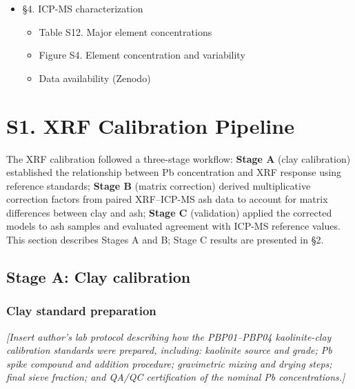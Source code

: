 \documentclass[journal=esthag,manuscript=suppinfo]{achemso}
\begin{document}
\begin{itemize}
\begin{itemize}
    \item Sampling campaign logistics
    \item Table S11. Sample inventory (42 ICP-MS samples; 33 XRF validation subset)
  \end{itemize}
  \item \S 4. ICP-MS characterization
  \begin{itemize}
    \item Table S12. Major element concentrations
    \item Figure S4. Element concentration and variability
    \item Data availability (Zenodo)
  \end{itemize}
\end{itemize}

\newpage


\section*{S1. XRF Calibration Pipeline}

The XRF calibration followed a three-stage workflow: \textbf{Stage A} (clay calibration) established the relationship between Pb concentration and XRF response using reference standards; \textbf{Stage B} (matrix correction) derived multiplicative correction factors from paired XRF--ICP-MS ash data to account for matrix differences between clay and ash; \textbf{Stage C} (validation) applied the corrected models to ash samples and evaluated agreement with ICP-MS reference values. This section describes Stages A and B; Stage C results are presented in \S2.

\subsection*{Stage A: Clay calibration}

\subsubsection*{Clay standard preparation}

\textit{[Insert author's lab protocol describing how the PBP01--PBP04
kaolinite-clay calibration standards were prepared, including: kaolinite
source and grade; Pb spike compound and addition procedure; gravimetric
mixing and drying steps; final sieve fraction; and QA/QC certification of
the nominal Pb concentrations.]}
\end{document}
